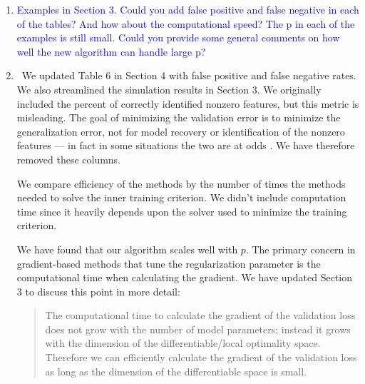\documentclass[]{article}
\newcommand{\point}[1]{\item \textcolor{blue}{#1}}
\newcommand{\reply}{\item[]\ }
\begin{document}
\begin{enumerate}
		\point{Examples in Section 3. Could you add false positive and false negative in each of the tables? And how about the computational speed? The p in each of the examples is still small. Could you provide some general comments on how well the new algorithm can handle large p?}
		
		\reply We updated Table 6 in Section 4 with false positive and false negative rates. We also streamlined the simulation results in Section 3. We originally included the percent of correctly identified nonzero features, but this metric is misleading. The goal of minimizing the validation error is to minimize the generalization error, not for model recovery or identification of the nonzero features --- in fact in some situations the two are at odds \citep{yang2005can, arlot2010survey}. We have therefore removed these columns.
		
		We compare efficiency of the methods by the number of times the methods needed to solve the inner training criterion. We didn't include computation time since it heavily depends upon the solver used to minimize the training criterion.
		
		We have found that our algorithm scales well with $p$. The primary concern in gradient-based methods that tune the regularization parameter is the computational time when calculating the gradient. We have updated Section 3 to discuss this point in more detail:
		
		\begin{quote}
			 The computational time to calculate the gradient of the validation loss does not grow with the number of model parameters; instead it grows with the dimension of the differentiable/local optimality space. Therefore we can efficiently calculate the gradient of the validation loss as long as the dimension of the differentiable space is small.
		\end{quote}
		
	\end{enumerate}



\end{document}
